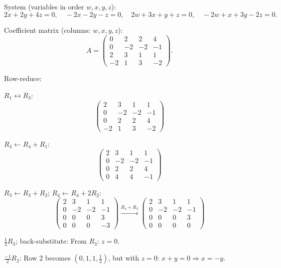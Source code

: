 \documentclass[12pt,a3paper]{article}
\begin{document}
\begin{tcolorbox}[enhanced,breakable,
  colback=cB!4,colframe=cB,boxrule=0.8pt,arc=5pt,
  title={\textbf{Answer --- Homogeneous System Solution}},
  fonttitle=\bfseries\color{white},colbacktitle=cB]

System (variables in order $w, x, y, z$):
\[
  2x+2y+4z=0,\quad -2x-2y-z=0,\quad 2w+3x+y+z=0,\quad -2w+x+3y-2z=0.
\]

Coefficient matrix (columns: $w, x, y, z$):
\[
  A=\begin{pmatrix}0&2&2&4\\0&-2&-2&-1\\2&3&1&1\\-2&1&3&-2\end{pmatrix}.
\]

Row-reduce:

$R_1\leftrightarrow R_3$:
\[
\begin{pmatrix}2&3&1&1\\0&-2&-2&-1\\0&2&2&4\\-2&1&3&-2\end{pmatrix}
\]

$R_4\leftarrow R_4+R_1$:
\[
\begin{pmatrix}2&3&1&1\\0&-2&-2&-1\\0&2&2&4\\0&4&4&-1\end{pmatrix}
\]

$R_3\leftarrow R_3+R_2$; $R_4\leftarrow R_4+2R_2$:
\[
\begin{pmatrix}2&3&1&1\\0&-2&-2&-1\\0&0&0&3\\0&0&0&-3\end{pmatrix}
\xrightarrow{R_4+R_3}
\begin{pmatrix}2&3&1&1\\0&-2&-2&-1\\0&0&0&3\\0&0&0&0\end{pmatrix}
\]

$\tfrac{1}{3}R_3$; back-substitute: From $R_3$: $z=0$.

$\tfrac{-1}{2}R_2$: Row 2 becomes $(0,1,1,\tfrac{1}{2})$, but with $z=0$:
$x+y=0 \Rightarrow x=-y$.


\end{tcolorbox}
\end{document}
